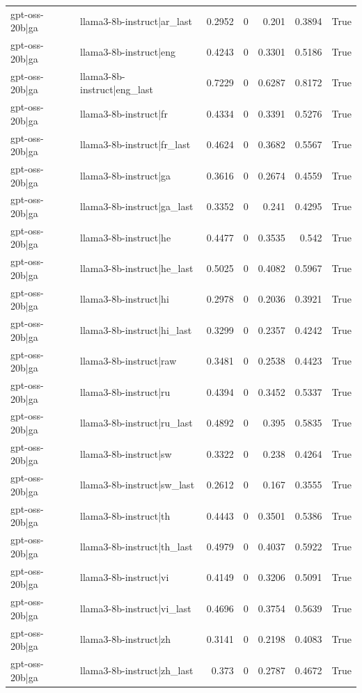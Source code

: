 \begin{table}
\begin{tabular}{l l r r r r l}
gpt-oss-20b|ga & llama3-8b-instruct|ar_last & 0.2952 & 0 & 0.201 & 0.3894 & True \\
gpt-oss-20b|ga & llama3-8b-instruct|eng & 0.4243 & 0 & 0.3301 & 0.5186 & True \\
gpt-oss-20b|ga & llama3-8b-instruct|eng_last & 0.7229 & 0 & 0.6287 & 0.8172 & True \\
gpt-oss-20b|ga & llama3-8b-instruct|fr & 0.4334 & 0 & 0.3391 & 0.5276 & True \\
gpt-oss-20b|ga & llama3-8b-instruct|fr_last & 0.4624 & 0 & 0.3682 & 0.5567 & True \\
gpt-oss-20b|ga & llama3-8b-instruct|ga & 0.3616 & 0 & 0.2674 & 0.4559 & True \\
gpt-oss-20b|ga & llama3-8b-instruct|ga_last & 0.3352 & 0 & 0.241 & 0.4295 & True \\
gpt-oss-20b|ga & llama3-8b-instruct|he & 0.4477 & 0 & 0.3535 & 0.542 & True \\
gpt-oss-20b|ga & llama3-8b-instruct|he_last & 0.5025 & 0 & 0.4082 & 0.5967 & True \\
gpt-oss-20b|ga & llama3-8b-instruct|hi & 0.2978 & 0 & 0.2036 & 0.3921 & True \\
gpt-oss-20b|ga & llama3-8b-instruct|hi_last & 0.3299 & 0 & 0.2357 & 0.4242 & True \\
gpt-oss-20b|ga & llama3-8b-instruct|raw & 0.3481 & 0 & 0.2538 & 0.4423 & True \\
gpt-oss-20b|ga & llama3-8b-instruct|ru & 0.4394 & 0 & 0.3452 & 0.5337 & True \\
gpt-oss-20b|ga & llama3-8b-instruct|ru_last & 0.4892 & 0 & 0.395 & 0.5835 & True \\
gpt-oss-20b|ga & llama3-8b-instruct|sw & 0.3322 & 0 & 0.238 & 0.4264 & True \\
gpt-oss-20b|ga & llama3-8b-instruct|sw_last & 0.2612 & 0 & 0.167 & 0.3555 & True \\
gpt-oss-20b|ga & llama3-8b-instruct|th & 0.4443 & 0 & 0.3501 & 0.5386 & True \\
gpt-oss-20b|ga & llama3-8b-instruct|th_last & 0.4979 & 0 & 0.4037 & 0.5922 & True \\
gpt-oss-20b|ga & llama3-8b-instruct|vi & 0.4149 & 0 & 0.3206 & 0.5091 & True \\
gpt-oss-20b|ga & llama3-8b-instruct|vi_last & 0.4696 & 0 & 0.3754 & 0.5639 & True \\
gpt-oss-20b|ga & llama3-8b-instruct|zh & 0.3141 & 0 & 0.2198 & 0.4083 & True \\
gpt-oss-20b|ga & llama3-8b-instruct|zh_last & 0.373 & 0 & 0.2787 & 0.4672 & True \\

\end{tabular}
\end{table}

